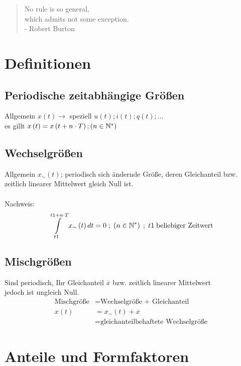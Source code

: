  \begin{quote}
  No rule is so general,\\which admits not some exception.\\- Robert Burton
 \end{quote}
 
\section{Definitionen}

\subsection{Periodische zeitabhängige Größen}
Allgemein \(x\left(t\right) \xrightarrow{}\) speziell \(u\left(t\right); i\left(t\right); q\left(t\right); \dots\) \\
es gillt \(x\left(t\right) = x\left(t + n \cdot T\right) ; \left(n \in \mathbb{N}^* \right) \)

\subsection{Wechselgrößen}
Allgemein \(x_{\sim} \left(t\right)\); periodisch sich ändernde Größe, deren Gleichanteil bzw. 
zeitlich linearer Mittelwert gleich Null ist. \\ \vspace{0mm} \\
Nachweis: \[\int\limits_{t1}^{t1 + n \cdot T} x_{\sim} \left(t\right)dt = 0 \; ; \; \left(n \in \mathbb{N}^* \right) \;
; \; t1 \; \text{beliebiger Zeitwert}\]

\subsection{Mischgrößen}
Sind periodisch, Ihr Gleichanteil \(\overline{x}\) bzw. zeitlich linearer Mittelwert \\
jedoch ist ungleich Null. 
\begin{align*}
\text{Mischgröße} &= \text{Wechselgröße + Gleichanteil} \\
x\left(t\right) &= x_{\sim}\left(t\right) + \overline{x} \\
&= \text{gleichanteilbehaftete Wechselgröße}
\end{align*}

\section{Anteile und Formfaktoren}

